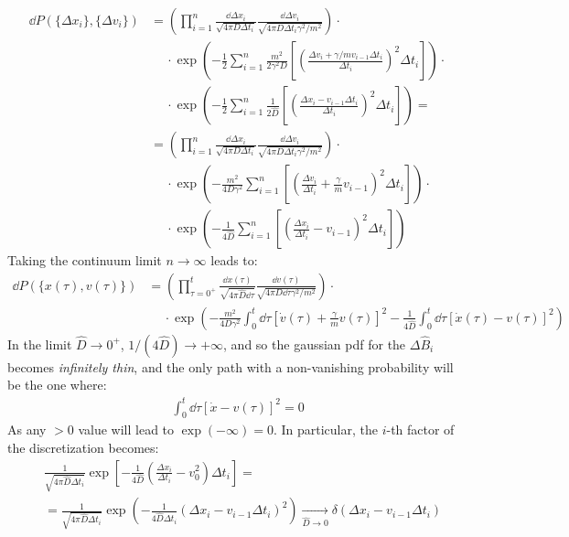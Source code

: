 \documentclass[../template.tex]{subfiles}
\begin{document}
\begin{align}\nonumber
    \dd{P}(\{\Delta x_i\}, \{\Delta v_i\}) &= \left(\prod_{i=1}^n \frac{\dd{\Delta x_i}}{\sqrt{4 \pi D \Delta t_i}} \frac{\dd{\Delta v_i}}{\sqrt{4 \pi D \Delta t_i \gamma^2 / m^2 }}  \right) \cdot\\ \nonumber
    &\quad \> \cdot \exp\left(-\frac{1}{2} \sum_{i=1}^n \frac{m^2}{2 \gamma^2 D} \left[\left(\frac{\Delta v_i + \gamma/m v_{i-1} \Delta t_i}{\Delta t_i} \right)^2 \Delta t_i \right]  \right) \cdot \\\nonumber
    &\quad \> \cdot \exp\left(-\frac{1}{2} \sum_{i=1}^n \frac{1}{2 \hat{D}} \left[\left(\frac{\Delta x_i - v_{i-1} \Delta t_i}{\Delta t_i} \right)^2 \Delta t_i\right]  \right) =\\\nonumber
    &= \left(\prod_{i=1}^n \frac{\dd{\Delta x_i}}{\sqrt{4 \pi D \Delta t_i}} \frac{\dd{\Delta v_i}}{\sqrt{4 \pi D \Delta t_i \gamma^2 / m^2 }}  \right) \cdot\\\nonumber
    &\quad \> \cdot \exp\left(-\frac{m^2}{4 D \gamma^2} \sum_{i=1}^n  \left[\left(\frac{\Delta v_i}{\Delta t_i} + \frac{\gamma}{m} v_{i-1}   \right)^2 \Delta t_i \right]  \right) \cdot \\ \label{eqn:discretizedP}
    &\quad \> \cdot \exp\left(-\frac{1}{4 \hat{D}} \sum_{i=1}^n  \left[\left(\frac{\Delta x_i}{\Delta t_i} - v_{i-1} \right)^2 \Delta t_i\right]  \right)
\end{align}
Taking the continuum limit $n \to \infty$ leads to:
\begin{align*}
    \dd{P}(\{x(\tau), v(\tau)\}) &= \left(\prod_{\tau = 0^+}^t \frac{\dd{x(\tau)}}{\sqrt{4 \pi \hat{D} \dd{\tau}}} \frac{\dd{v(\tau)}}{\sqrt{4 \pi D \dd{\tau} \gamma^2/m^2}}  \right)\cdot\\
    &\quad \>\cdot  \exp\left(-\frac{m^2}{4 D \gamma^2} \int_0^t \dd{\tau} \left[\dot{v}(\tau) + \frac{\gamma}{m} v(\tau) \right]^2 - \frac{1}{4 \hat{D}} \int_0^t \dd{\tau} [\dot{x}(\tau)- v(\tau)]^2 \right)
\end{align*}
In the limit $\hat{D} \to 0^+$, $1/(4 \hat{D}) \to +\infty$, and so the gaussian pdf for the $\Delta \hat{B}_i$ becomes \textit{infinitely thin}, and the only path with a non-vanishing probability will be the one where:
\begin{align*}
    \int_0^t \dd{\tau} [\dot{x} - v(\tau)]^2 = 0
\end{align*} 
As any $> 0$ value will lead to $\exp(-\infty) = 0$. In particular, the $i$-th factor of the discretization becomes:
\begin{align*}
    &\frac{1}{\sqrt{4 \pi \hat{D} \Delta t_i}} \exp\left[-\frac{1}{4 \hat{D}} \left(\frac{\Delta x_i}{\Delta t_i} - v_0^2 \right) \Delta t_i \right] =\\
    &= \frac{1}{\sqrt{4 \pi \hat{D} \Delta t_i}}  \exp\left(-\frac{1}{4 \hat{D} \Delta t_i} (\Delta x_i - v_{i-1} \Delta t_i)^2 \right)  \xrightarrow[\hat{D} \to 0]{}  \delta(\Delta x_i - v_{i-1} \Delta t_i)
\end{align*}
\end{document}

